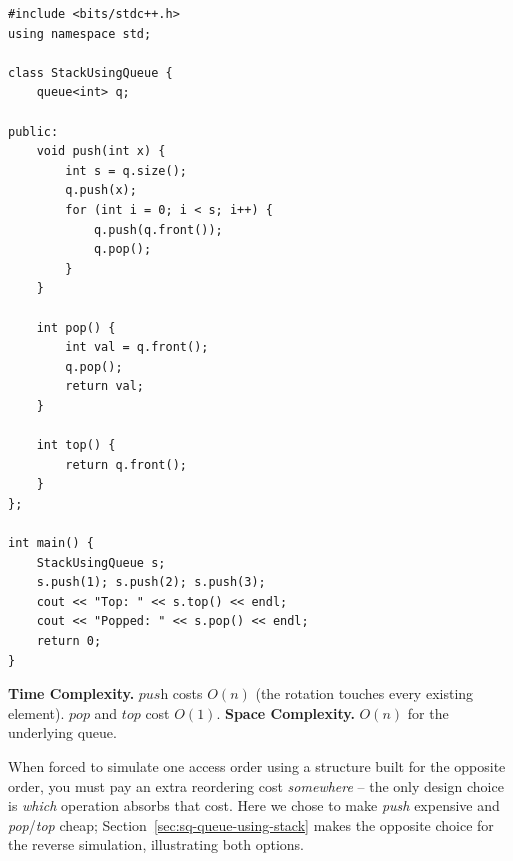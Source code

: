 \begin{lstlisting}
#include <bits/stdc++.h>
using namespace std;

class StackUsingQueue {
    queue<int> q;

public:
    void push(int x) {
        int s = q.size();
        q.push(x);
        for (int i = 0; i < s; i++) {
            q.push(q.front());
            q.pop();
        }
    }

    int pop() {
        int val = q.front();
        q.pop();
        return val;
    }

    int top() {
        return q.front();
    }
};

int main() {
    StackUsingQueue s;
    s.push(1); s.push(2); s.push(3);
    cout << "Top: " << s.top() << endl;
    cout << "Popped: " << s.pop() << endl;
    return 0;
}
\end{lstlisting}

\begin{complexitybox}
\textbf{Time Complexity.} $\textit{push}$ costs $O(n)$ (the rotation
touches every existing element). $\textit{pop}$ and $\textit{top}$ cost
$O(1)$.
\textbf{Space Complexity.} $O(n)$ for the underlying queue.
\end{complexitybox}

\begin{takeawaybox}
When forced to simulate one access order using a structure built for the
opposite order, you must pay an extra reordering cost \emph{somewhere} --
the only design choice is \emph{which} operation absorbs that cost. Here
we chose to make \textit{push} expensive and \textit{pop}/\textit{top}
cheap; Section~\ref{sec:sq-queue-using-stack} makes the opposite choice
for the reverse simulation, illustrating both options.
\end{takeawaybox}

